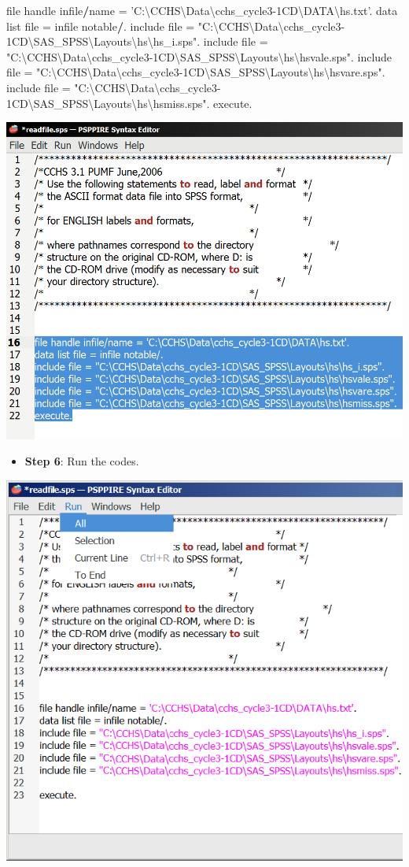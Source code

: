 \documentclass[
]{book}
\newenvironment{Shaded}{\begin{snugshade}}{\end{snugshade}}
\newcommand{\NormalTok}[1]{#1}
\newcommand{\OperatorTok}[1]{\textcolor[rgb]{0.81,0.36,0.00}{\textbf{#1}}}
\newcommand{\StringTok}[1]{\textcolor[rgb]{0.31,0.60,0.02}{#1}}
\providecommand{\tightlist}{%
  \setlength{\itemsep}{0pt}\setlength{\parskip}{0pt}}
\begin{document}
\begin{Shaded}
\begin{Highlighting}[]
\NormalTok{file handle infile}\OperatorTok{/}\NormalTok{name =}\StringTok{ 'C:\textbackslash{}CCHS\textbackslash{}Data\textbackslash{}cchs_cycle3-1CD\textbackslash{}DATA\textbackslash{}hs.txt'}\NormalTok{.}
\NormalTok{data list file =}\StringTok{ }\NormalTok{infile notable}\OperatorTok{/}\NormalTok{.}
\NormalTok{include file =}\StringTok{ "C:\textbackslash{}CCHS\textbackslash{}Data\textbackslash{}cchs_cycle3-1CD\textbackslash{}SAS_SPSS\textbackslash{}Layouts\textbackslash{}hs\textbackslash{}hs_i.sps"}\NormalTok{.}
\NormalTok{include file =}\StringTok{ "C:\textbackslash{}CCHS\textbackslash{}Data\textbackslash{}cchs_cycle3-1CD\textbackslash{}SAS_SPSS\textbackslash{}Layouts\textbackslash{}hs\textbackslash{}hsvale.sps"}\NormalTok{.}
\NormalTok{include file =}\StringTok{ "C:\textbackslash{}CCHS\textbackslash{}Data\textbackslash{}cchs_cycle3-1CD\textbackslash{}SAS_SPSS\textbackslash{}Layouts\textbackslash{}hs\textbackslash{}hsvare.sps"}\NormalTok{.}
\NormalTok{include file =}\StringTok{ "C:\textbackslash{}CCHS\textbackslash{}Data\textbackslash{}cchs_cycle3-1CD\textbackslash{}SAS_SPSS\textbackslash{}Layouts\textbackslash{}hs\textbackslash{}hsmiss.sps"}\NormalTok{.}
\NormalTok{execute.}
\end{Highlighting}
\end{Shaded}

\includegraphics[width=0.65\linewidth]{images/abacusX34}

\begin{itemize}
\tightlist
\item
  \textbf{Step 6}: Run the codes.
\end{itemize}

\includegraphics[width=0.65\linewidth]{images/abacus35}
\end{document}
